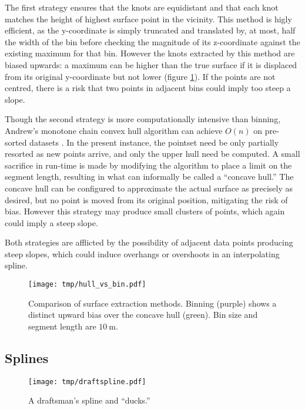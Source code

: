 \documentclass[doc]{apa6}
\begin{document}
The first strategy ensures that the knots are equidistant and that each knot matches the height of highest surface point in the vicinity. This method is higly efficient, as the y-coordinate is simply truncated and translated by, at most, half the width of the bin before checking the magnitude of its z-coordinate against the existing maximum for that bin. However the knots extracted by this method are biased upwards: a maximum can be higher than the true surface if it is displaced from its original y-coordinate but not lower (figure \ref{fig:hull_vs_bin}). If the points are not centred, there is a risk that two points in adjacent bins could imply too steep a slope.

Though the second strategy is more computationally intensive than binning, Andrew's monotone chain convex hull algorithm can achieve $O(n)$ on pre-sorted datasets \parencite{Andrew1979}. In the present instance, the pointset need be only partially resorted as new points arrive, and only the upper hull need be computed. A small sacrifice in run-time is made by modifying the algorithm to place a limit on the segment length, resulting in what can informally be called a ``concave hull.'' The concave hull can be configured to approximate the actual surface as precisely as desired, but no point is moved from its original position, mitigating the risk of bias. However this strategy may produce small clusters of points, which again could imply a steep slope.

Both strategies are afflicted by the possibility of adjacent data points producing steep slopes, which could induce overhangs or overshoots in an interpolating spline.

\begin{figure} %
\texttt{[image: tmp/hull\_vs\_bin.pdf]} 
\caption{Comparison of surface extraction methods. Binning (purple) shows a distinct upward bias over the concave hull (green). Bin size and segment length are $\SI{10}\m$.}
\label{fig:hull_vs_bin}
\end{figure}


\subsection{Splines}

\begin{figure} %
\texttt{[image: tmp/draftspline.pdf]} 
\caption{A draftsman's spline and ``ducks.'' \parencite{DeBoor2006}}
\label{fig:spline}
\end{figure}
\end{document}
